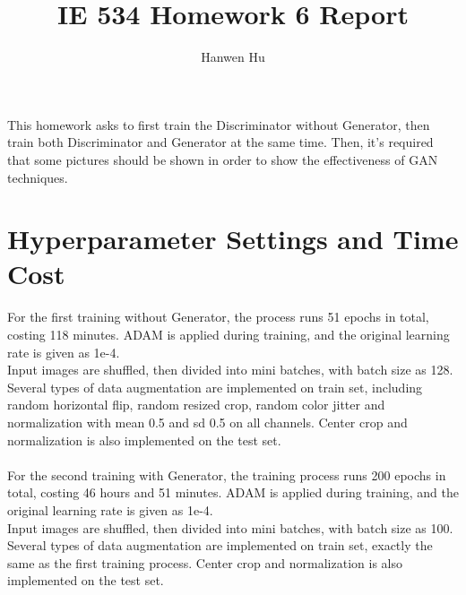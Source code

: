 \documentclass[15pt]{article}
\title{IE 534 Homework 6 Report}
\author{Hanwen Hu}
\begin{document}
\maketitle

This homework asks to first train the Discriminator without Generator, then train both Discriminator and Generator at the same time. Then, it's required that some pictures should be shown in order to show the effectiveness of GAN techniques.

\section{Hyperparameter Settings and Time Cost}
For the first training without Generator, the process runs 51 epochs in total, costing 118 minutes. ADAM is applied during training, and the original learning rate is given as 1e-4. \\
Input images are shuffled, then divided into mini batches, with batch size as 128. Several types of data augmentation are implemented on train set, including random horizontal flip, random resized crop, random color jitter and normalization with mean 0.5 and sd 0.5 on all channels. Center crop and normalization is also implemented on the test set.\\
\\
For the second training with Generator, the training process runs 200 epochs in total, costing 46 hours and 51 minutes. ADAM is applied during training, and the original learning rate is given as 1e-4.\\
Input images are shuffled, then divided into mini batches, with batch size as 100. Several types of data augmentation are implemented on train set, exactly the same as the first training process. Center crop and normalization is also implemented on the test set.\\
\end{document}
